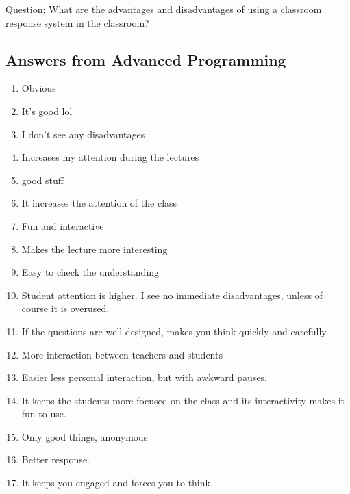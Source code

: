 Question: What are the advantages and disadvantages of using a classroom response system in the classroom?

\subsection{Answers from Advanced Programming}\label{app:qualitative-advanced}
\begin{enumerate}
    \item Obvious

    \item It's good lol

    \item I don't see any disadvantages

    \item Increases my attention during the lectures

    \item good stuff

    \item It increases the attention of the class

    \item Fun and interactive 

    \item Makes the lecture more interesting

    \item Easy to check the understanding

    \item Student attention is higher. I see no immediate disadvantages, unless of course it is overused.

    \item If the questions are well designed, makes you think quickly and carefully

    \item More interaction between teachers and students

    \item Easier less personal interaction, but with awkward pauses.

    \item It keeps the students more focused on the class and its interactivity makes it fun to use.

    \item Only good things, anonymous

    \item Better response.

    \item It keeps you engaged and forces you to think. 


\end{enumerate}
